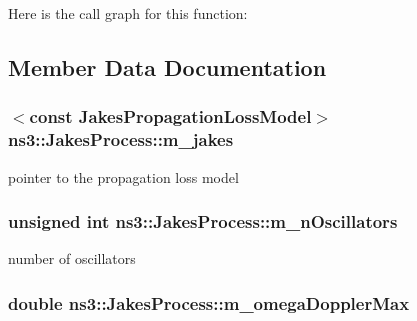 Here is the call graph for this function\+:




\subsection{Member Data Documentation}
\subsubsection[{\texorpdfstring{m\+\_\+jakes}{m_jakes}}]{$<$const {\bf Jakes\+Propagation\+Loss\+Model}$>$ ns3\+::\+Jakes\+Process\+::m\+\_\+jakes\hspace{0.3cm}{\ttfamily [private]}}\hypertarget{classns3_1_1JakesProcess_aec08be974a3d3428286077332e09957e}{}\label{classns3_1_1JakesProcess_aec08be974a3d3428286077332e09957e}


pointer to the propagation loss model 

\subsubsection[{\texorpdfstring{m\+\_\+n\+Oscillators}{m_nOscillators}}]{\setlength{\rightskip}{0pt plus 5cm}unsigned int ns3\+::\+Jakes\+Process\+::m\+\_\+n\+Oscillators\hspace{0.3cm}{\ttfamily [private]}}\hypertarget{classns3_1_1JakesProcess_a356927b16370f2b694f61775adbb1c4b}{}\label{classns3_1_1JakesProcess_a356927b16370f2b694f61775adbb1c4b}


number of oscillators 

\subsubsection[{\texorpdfstring{m\+\_\+omega\+Doppler\+Max}{m_omegaDopplerMax}}]{\setlength{\rightskip}{0pt plus 5cm}double ns3\+::\+Jakes\+Process\+::m\+\_\+omega\+Doppler\+Max\hspace{0.3cm}{\ttfamily [private]}}\hypertarget{classns3_1_1JakesProcess_ac9e2529b40af28efc63d75c981617594}{}\label{classns3_1_1JakesProcess_ac9e2529b40af28efc63d75c981617594}


